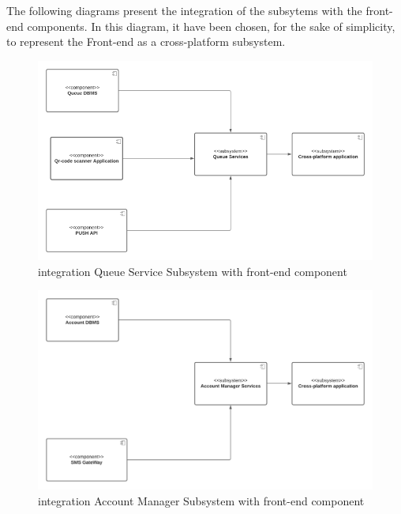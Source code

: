 The following diagrams present the integration of the subsytems with the front-end components. In this diagram, it have been chosen, for the sake of simplicity, to represent the Front-end as a cross-platform subsystem. 

\begin{figure}[h!]
    \centering
    \includegraphics[width=1\textwidth]{Images/TestDiagram/view.png}
    \caption{\label{fig:viewQueue}{integration Queue Service Subsystem with front-end component}}
\end{figure}
\FloatBarrier 
\begin{figure}[h!]
    \centering
    \includegraphics[width=1\textwidth]{Images/TestDiagram/viewAccount.png}
    \caption{\label{fig:viewAccount}{integration Account Manager Subsystem with front-end component}}
\end{figure}
\FloatBarrier 
